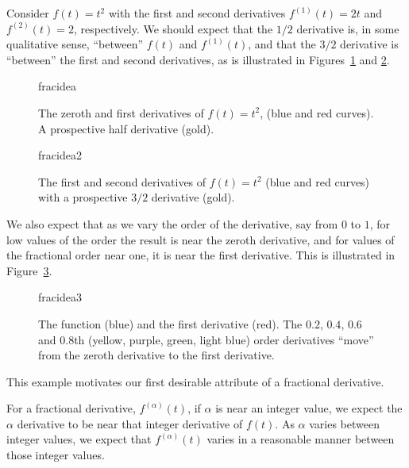 \begin{example}
  Consider $f(t) = t^2$ with the first and second derivatives $f^{(1)}(t) = 2 t$ and $f^{(2)}(t) = 2$, respectively. We should expect that the $1/2$ derivative is, in some qualitative sense, ``between'' $f(t)$ and $f^{(1)}(t)$, and that the $3/2$ derivative is ``between'' the first and second derivatives, as is illustrated in Figures~\ref{fig:fracidea1} and \ref{fig:fracidea2}.

  \begin{figure}
    \centering
    {fracidea}
    \caption{The zeroth and first derivatives of $f(t)=t^2$, (blue and red curves). A prospective half derivative (gold).}
    \label{fig:fracidea1}
  \end{figure}

  \begin{figure}
    \centering
    {fracidea2}
    \caption{The first and second derivatives of $f(t)=t^2$ (blue and red curves) with a prospective $3/2$ derivative (gold).}
    \label{fig:fracidea2}
  \end{figure}

  We also expect that as we vary the order of the derivative, say from $0$ to $1$, for low values of the order the result is near the zeroth derivative, and for values of the fractional order near one, it is near the first derivative. This is illustrated in Figure~\ref{fig:fracidea3}.

  \begin{figure}
    \centering
    {fracidea3}
    \caption{The function (blue) and the first derivative (red). The $0.2$, $0.4$, $0.6$ and $0.8$th (yellow, purple, green, light blue) order derivatives ``move'' from the zeroth derivative to the first derivative.}
    \label{fig:fracidea3}
  \end{figure}
\end{example}

This example motivates our first desirable attribute of a fractional derivative.

\begin{attribute}
  For a fractional derivative, $f^{\left( \alpha \right)}(t)$, if $\alpha$ is near an integer value, we expect the $\alpha$ derivative to be near that integer derivative of $f(t)$. As $\alpha$ varies between integer values, we expect that $f^{\left( \alpha \right)}(t)$ varies in a reasonable manner between those integer values.
\end{attribute}

